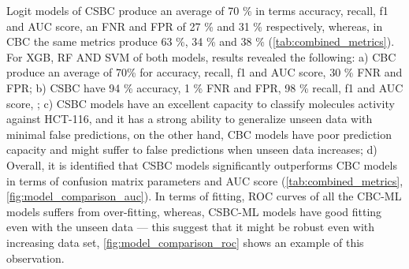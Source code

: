 Logit models of CSBC produce an average of 70 \% in terms accuracy, recall, f1 and AUC score, an FNR and FPR of 27 \% and 31 \% respectively, whereas, in CBC the same metrics produce 63 \%, 34 \% and 38 \% (\autoref{tab:combined_metrics}). For XGB, RF AND SVM of both models, results revealed the following: a) CBC produce an average of 70\% for accuracy, recall, f1 and AUC score, 30 \% FNR and FPR; b) CSBC have 94 \% accuracy, 1 \% FNR and FPR, 98 \% recall, f1 and AUC score, ; c) CSBC models have an excellent capacity to classify molecules activity against HCT-116, and it has a strong ability to generalize unseen data with minimal false predictions, on the other hand, CBC models have poor prediction capacity and might suffer to false predictions when unseen data increases; d) Overall, it is identified that CSBC models significantly outperforms CBC models in terms of confusion matrix parameters and AUC score (\autoref{tab:combined_metrics}, \autoref{fig:model_comparison_auc}). In terms of fitting, ROC curves of all the CBC-ML models suffers from over-fitting, whereas, CSBC-ML models have good fitting even with the unseen data --- this suggest that it might be robust even with increasing data set, \autoref{fig:model_comparison_roc} shows an example of this observation. 


